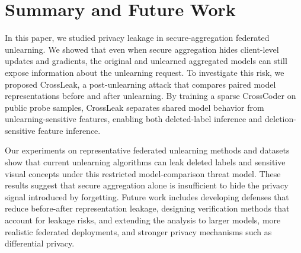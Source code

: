 


 

\section{Summary and Future Work} \label{s_a_fw}

In this paper, we studied privacy leakage in secure-aggregation federated unlearning. We showed that even when secure aggregation hides client-level updates and gradients, the original and unlearned aggregated models can still expose information about the unlearning request. To investigate this risk, we proposed CrossLeak, a post-unlearning attack that compares paired model representations before and after unlearning. By training a sparse CrossCoder on public probe samples, CrossLeak separates shared model behavior from unlearning-sensitive features, enabling both deleted-label inference and deletion-sensitive feature inference.

Our experiments on representative federated unlearning methods and datasets show that current unlearning algorithms can leak deleted labels and sensitive visual concepts under this restricted model-comparison threat model. These results suggest that secure aggregation alone is insufficient to hide the privacy signal introduced by forgetting. Future work includes developing defenses that reduce before-after representation leakage, designing verification methods that account for leakage risks, and extending the analysis to larger models, more realistic federated deployments, and stronger privacy mechanisms such as differential privacy.

 
 

 



 

 
